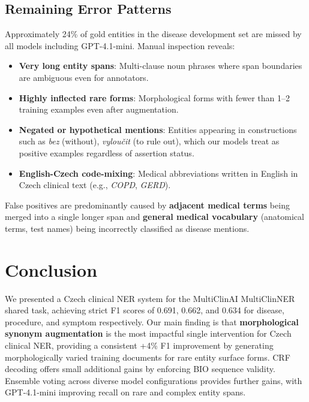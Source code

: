 \documentclass[11pt]{article}
\begin{document}
\subsection{Remaining Error Patterns}

Approximately 24\% of gold entities in the disease development set are missed by all
models including GPT-4.1-mini. Manual inspection reveals:

\begin{itemize}
  \item \textbf{Very long entity spans}: Multi-clause noun phrases where span boundaries
        are ambiguous even for annotators.
  \item \textbf{Highly inflected rare forms}: Morphological forms with fewer than 1--2
        training examples even after augmentation.
  \item \textbf{Negated or hypothetical mentions}: Entities appearing in constructions
        such as \textit{bez} (without), \textit{vyloučit} (to rule out), which our
        models treat as positive examples regardless of assertion status.
  \item \textbf{English-Czech code-mixing}: Medical abbreviations written in English
        in Czech clinical text (e.g., \textit{COPD}, \textit{GERD}).
\end{itemize}

False positives are predominantly caused by \textbf{adjacent medical terms} being merged
into a single longer span and \textbf{general medical vocabulary} (anatomical terms, test
names) being incorrectly classified as disease mentions.

\section{Conclusion}

We presented a Czech clinical NER system for the MultiClinAI MultiClinNER shared task,
achieving strict F1 scores of 0.691, 0.662, and 0.634 for disease, procedure, and
symptom respectively. Our main finding is that \textbf{morphological synonym augmentation}
is the most impactful single intervention for Czech clinical NER, providing a consistent
+4\% F1 improvement by generating morphologically varied training documents for rare
entity surface forms. CRF decoding offers small additional gains by enforcing BIO
sequence validity. Ensemble voting across diverse model configurations provides further
gains, with GPT-4.1-mini improving recall on rare and complex entity spans.
\end{document}
